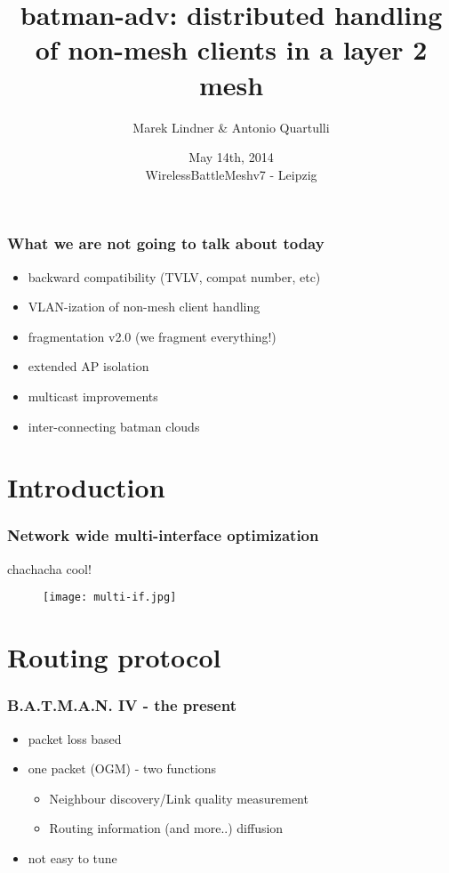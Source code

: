 \documentclass[slidestop]{beamer}
\title[batman-adv: distributed handling of non-mesh clients in a layer 2 mesh]{batman-adv: distributed handling of non-mesh clients in a layer 2 mesh}
\author{Marek Lindner \& Antonio Quartulli}
\date{May 14th, 2014\\WirelessBattleMeshv7 - Leipzig}
\institute[]{B.A.T.M.A.N.-Advanced\\www.open-mesh.org}
\begin{document}
\begin{frame}
	\titlepage
\end{frame}

\begin{frame}[c]
	\frametitle{What we are not going to talk about today}
	\begin{itemize}
		\item backward compatibility (TVLV, compat number, etc)
		\item VLAN-ization of non-mesh client handling
		\item fragmentation v2.0 (we fragment everything!)
		\item extended AP isolation
		\item multicast improvements
		\item inter-connecting batman clouds
	\end{itemize}
\end{frame}

\section{Introduction}
\begin{frame}[c]
	\frametitle{Network wide multi-interface optimization}
	chachacha cool!
	\begin{figure}
		\centering
		\texttt{[image: multi-if.jpg]}
	\end{figure}
\end{frame}

\section{Routing protocol}
\begin{frame}[c]
	\frametitle{B.A.T.M.A.N. IV - the present}
	\begin{itemize}
		\item packet loss based
		\item one packet (OGM) - two functions
			\begin{itemize}
				\item Neighbour discovery/Link quality
					measurement
				\item Routing information (and more..) diffusion
			\end{itemize}
		\item not easy to tune
	\end{itemize}
	\begin{figure}
		\centering
	\end{figure}
\end{frame}
\end{document}
